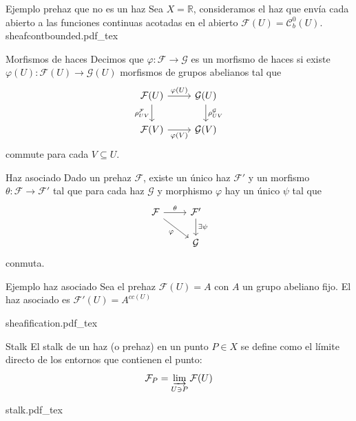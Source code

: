 \documentclass[10pt]{beamer}
\newcommand{\incfig}[1]{%
\center
\def\svgwidth{0.9\columnwidth}
{#1.pdf_tex}
}
\begin{document}
\begin{frame}[fragile]{Ejemplo prehaz que no es un haz}
Sea $X = \mathbb{R}$, consideramos el haz que envía cada abierto a las funciones continuas acotadas en el abierto $\mathcal{F}(U) = \mathcal{C}_b^0(U)$.
\incfig{sheafcontbounded}
\end{frame}


\begin{frame}[fragile]{Morfismos de haces}
Decimos que $\varphi : \mathcal{F} \to \mathcal{G}$ es un morfismo de haces si existe $\varphi (U): \mathcal{F}(U) \to \mathcal{G}(U)$  morfismos de grupos abelianos tal que
\[\begin{tikzcd}
	{\mathcal{F}(U)} & {\mathcal{G}(U)} \\
	{\mathcal{F}(V)} & {\mathcal{G}(V)}
	\arrow["{\varphi(U)}", from=1-1, to=1-2]
	\arrow["{\rho^\mathcal{F} _{UV}}"', from=1-1, to=2-1]
	\arrow["{\rho^\mathcal{G} _{UV}}", from=1-2, to=2-2]
	\arrow["{\varphi(V)}"', from=2-1, to=2-2]
\end{tikzcd}\]
commute para cada $V \subseteq U$.
\end{frame}

\begin{frame}[fragile]{Haz asociado}
Dado un prehaz $\mathcal{F}$, existe un único haz $\mathcal{F}'$ y un morfismo $\theta: \mathcal{F} \to \mathcal{F}'$  tal que para cada haz $\mathcal{G} $ y morphismo $\varphi $ hay un único $\psi $ tal que
\[\begin{tikzcd}
	{\mathcal{F}} & {\mathcal{F}'} \\
	& {\mathcal{G}}
	\arrow["\theta", from=1-1, to=1-2]
	\arrow["\varphi"', from=1-1, to=2-2]
	\arrow["\exists \psi", from=1-2, to=2-2]
\end{tikzcd}\]
conmuta.
\end{frame}

\begin{frame}[fragile]{Ejemplo haz asociado}
Sea el prehaz $\mathcal{F}(U) = A$ con $A$ un grupo abeliano fijo. El haz asociado es $\mathcal{F}'(U) = A^{c c(U)} $ 

\incfig{sheafification}

\end{frame}


\begin{frame}[fragile]{Stalk}
El stalk de un haz (o prehaz) en un punto $P\in X$ se define como el límite directo de los entornos que contienen el punto:
\[
\mathcal{F}_P = \varinjlim_{U \ni P} \mathcal{F}(U) 
\]

\incfig{stalk}

\end{frame}
\end{document}
